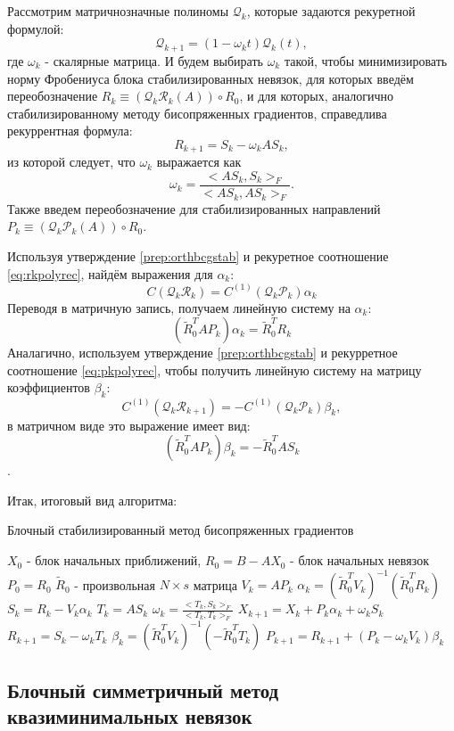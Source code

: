 Рассмотрим матричнозначные полиномы $\mathcal{Q}_k$, которые задаются рекуретной формулой:
\begin{equation*}
    \mathcal{Q}_{k+1} = (1-\omega_k t)\mathcal{Q}_k(t),
\end{equation*}
где $\omega_k$ - скалярные матрица. И будем выбирать $\omega_k$ такой, чтобы минимизировать норму 
Фробениуса блока стабилизированных невязок, для которых введём переобозначение $R_{k} \equiv (\mathcal{Q}_k\mathcal{R}_k(A)) \circ R_0$, и для которых, аналогично стабилизированному методу бисопряженных градиентов, справедлива рекуррентная формула:
$$R_{k+1} =  S_k - \omega_k A S_k,$$
из которой следует, что $\omega_k$ выражается как
 $$\omega_k = \frac{<AS_k,S_k>_F}{<AS_k,AS_k>_F}.$$
Также введем переобозначение для стабилизированных направлений $P_k \equiv (\mathcal{Q}_k \mathcal{P}_k (A)) \circ R_0$.


Используя утверждение \ref{prep:orthbcgstab} и рекуретное соотношение \eqref{eq:rkpolyrec}, 
найдём выражения для $\alpha_k$:
$$C(\mathcal{Q}_k \mathcal{R}_k) = C^{(1)}(\mathcal{Q}_k\mathcal{P}_k)\alpha_k $$
Переводя в матричную запись, получаем линейную систему на $\alpha_k$:
$$(\tilde{R}_0^T AP_k)\alpha_k = \tilde{R}_0^TR_k$$
Аналагично, используем утверждение \ref{prep:orthbcgstab} и рекурретное соотношение \eqref{eq:pkpolyrec}, чтобы получить линейную систему на матрицу коэффициентов $\beta_k$:
$$C^{(1)}(\mathcal{Q}_k\mathcal{R}_{k+1}) = - C^{(1)}(\mathcal{Q}_k \mathcal{P}_k)\beta_k,$$
в матричном виде это выражение имеет вид:
$$(\tilde{R}_0^T A P_k)\beta_k=-\tilde{R}_0^T A S_k$$.

Итак, итоговый вид алгоритма:
\begin{algorithm}
    \caption{Блочный стабилизированный метод бисопряженных градиентов}
    \begin{algorithmic}[1]
        \State $X_0$ - блок начальных приближений, $R_0 = B - AX_0$ - блок начальных невязок
        \State $P_0 = R_0$
        \State $\tilde{R}_0$ - произвольная $N \times s$ матрица
            \State $V_k = AP_k$
            \State $\alpha_k = (\tilde{R}_0^TV_k)^{-1}(\tilde{R}_0^T R_k)$
            \State $S_k = R_k - V_k \alpha_k$
            \State $T_k = A S_k$
            \State $\omega_k = \frac{<T_k,S_k>_F}{<T_k,T_k>_F}$
            \State $X_{k+1} = X_k + P_k \alpha_k + \omega_k S_k$
            \State $R_{k+1} = S_{k} - \omega_k T_k$
            \State $\beta_k = (\tilde{R}_0^T V_k)^{-1}(-\tilde{R}_0^T T_k)$
            \State $P_{k+1} = R_{k+1} + (P_k-\omega_kV_k)\beta_k$
        \EndFor
    \end{algorithmic}
\end{algorithm}
\subsection[Блочный симметричный метод квазиминимальных невязок]{Блочный симметричный метод квазиминимальных невязок \cite{doi:10.1137/0917019}}


\newpage
